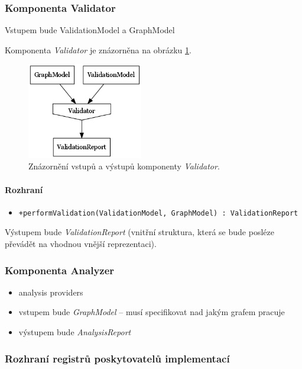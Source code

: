 \subsubsection{Komponenta Validator}
Vstupem bude ValidationModel a GraphModel

Komponenta \emph{Validator} je znázorněna na obrázku \ref{design-validator_io}.

\begin{figure}[h!]
  \centering
  \includegraphics[width=0.45\textwidth]{./graphs/validator_io_graph.png}
  \caption{Znázornění vstupů a výstupů komponenty \emph{Validator}.\label{design-validator_io}}
\end{figure}

\paragraph{Rozhraní}
\begin{itemize}
\item \verb-+performValidation(ValidationModel, GraphModel) : ValidationReport-
\end{itemize}

Výstupem bude \emph{ValidationReport} (vnitřní struktura, která se bude posléze převádět na vhodnou vnější reprezentaci).

\subsubsection{Komponenta Analyzer}
\begin{itemize}
\item analysis providers
\item vstupem bude \emph{GraphModel} -- musí specifikovat nad jakým grafem pracuje
\item výstupem bude \emph{AnalysisReport}
\end{itemize}

\subsubsection{Rozhraní registrů poskytovatelů implementací}

